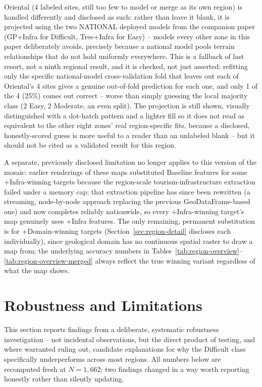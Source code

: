 \documentclass[11pt,a4paper]{article}
\begin{document}
Oriental (4 labeled sites, still too few to model or merge as its own region) is handled differently and disclosed as such: rather than leave it blank, it is projected using the two NATIONAL deployed models from the companion paper (GP+Infra for Difficult, Tree+Infra for Easy) -- models every other zone in this paper deliberately avoids, precisely because a national model pools terrain relationships that do not hold uniformly everywhere. This is a fallback of last resort, not a ninth regional result, and it is checked, not just asserted: refitting only the specific national-model cross-validation fold that leaves out each of Oriental's 4 sites gives a genuine out-of-fold prediction for each one, and only 1 of the 4 (25\%) comes out correct -- worse than simply guessing the local majority class (2 Easy, 2 Moderate, an even split). The projection is still shown, visually distinguished with a dot-hatch pattern and a lighter fill so it does not read as equivalent to the other eight zones' real region-specific fits, because a disclosed, honestly-scored guess is more useful to a reader than an unlabeled blank -- but it should not be cited as a validated result for this region.

A separate, previously disclosed limitation no longer applies to this version of the mosaic: earlier renderings of these maps substituted Baseline features for some +Infra-winning targets because the region-scale tourism-infrastructure extraction failed under a memory cap; that extraction pipeline has since been rewritten (a streaming, node-by-node approach replacing the previous GeoDataFrame-based one) and now completes reliably nationwide, so every +Infra-winning target's map genuinely uses +Infra features. The only remaining, permanent substitution is for +Domain-winning targets (Section~\ref{sec:region-detail} discloses each individually), since geological domain has no continuous spatial raster to draw a map from; the underlying accuracy numbers in Tables~\ref{tab:region-overview}--\ref{tab:region-overview-merged} always reflect the true winning variant regardless of what the map shows.

\section{Robustness and Limitations}
\label{sec:robustness}
This section reports findings from a deliberate, systematic robustness investigation -- not incidental observations, but the direct product of testing, and where warranted ruling out, candidate explanations for why the Difficult class specifically underperforms across most regions. All numbers below are recomputed fresh at $N=1{,}662$; two findings changed in a way worth reporting honestly rather than silently updating.
\end{document}
